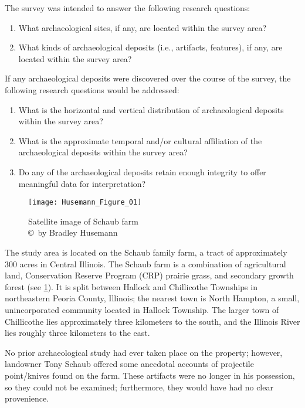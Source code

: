The survey was intended to answer the following research questions:

\begin{enumerate}
	\item What archaeological sites, if any, are located within the survey area?
	\item What kinds of archaeological deposits (i.e., artifacts, features), if any, are located within the survey area?
\end{enumerate}

If any archaeological deposits were discovered over the course of the survey, the following research questions would be addressed:

\begin{enumerate}
	\item What is the horizontal and vertical distribution of archaeological deposits within the survey area?
	\item What is the approximate temporal and/or cultural affiliation of the archaeological deposits within the survey area?
	\item Do any of the archaeological deposits retain enough integrity to offer meaningful data for interpretation?
\end{enumerate}


\begin{figure}[!htb]
	\texttt{[image: Husemann\_Figure\_01]}
	\caption{Satellite image of Schaub farm
		{\normalfont\scriptsize \\ \copyright\ by Bradley Husemann
	}}
	\label{fig:Husemann_Figure_01}
\end{figure}


The study area is located on the Schaub family farm, a tract of approximately 300 acres in Central Illinois. The Schaub farm is a combination of agricultural land, Conservation Reserve Program (CRP) prairie grass, and secondary growth forest (see \ref{fig:Husemann_Figure_01}). It is split between Hallock and Chillicothe Townships in northeastern Peoria County, Illinois; the nearest town is North Hampton, a small, unincorporated community located in Hallock Township. The larger town of Chillicothe lies approximately three kilometers to the south, and the Illinois River lies roughly three kilometers to the east.

No prior archaeological study had ever taken place on the property; however, landowner Tony Schaub offered some anecdotal accounts of projectile point/knives found on the farm. These artifacts were no longer in his possession, so they could not be examined; furthermore, they would have had no clear provenience.

